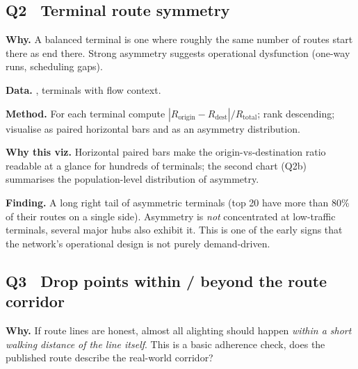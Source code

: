 
\subsection{Q2 \textbullet\ Terminal route symmetry}

\textbf{Why.} A balanced terminal is one where roughly the same number
of routes start there as end there. Strong asymmetry suggests
operational dysfunction (one-way runs, scheduling gaps).

\textbf{Data.} , terminals with
flow context.

\textbf{Method.} For each terminal compute
$|R_\text{origin} - R_\text{dest}| / R_\text{total}$; rank descending;
visualise as paired horizontal bars and as an asymmetry distribution.


\textbf{Why this viz.} Horizontal paired bars make the
origin-vs-destination ratio readable at a glance for hundreds of
terminals; the second chart (Q2b) summarises the population-level
distribution of asymmetry.

\textbf{Finding.} A long right tail of asymmetric terminals (top 20
have more than 80\% of their routes on a single side). Asymmetry is
\emph{not} concentrated at low-traffic terminals, several major hubs
also exhibit it. This is one of the early signs that the network's
operational design is not purely demand-driven.


\subsection{Q3 \textbullet\ Drop points within / beyond the route corridor}

\textbf{Why.} If route lines are honest, almost all alighting should
happen \emph{within a short walking distance of the line itself}. This
is a basic adherence check, does the published route describe the
real-world corridor?


